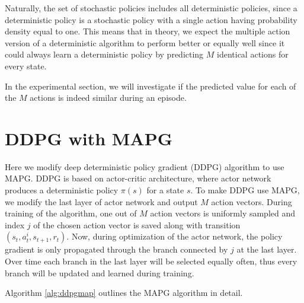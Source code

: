 Naturally, the set of stochastic policies includes all deterministic policies, since a deterministic policy is a stochastic policy with a single action having probability density equal to one. This means that in theory, we expect the multiple action version of a deterministic algorithm to perform better or equally well since it could always learn a deterministic policy by predicting $M$ identical actions for every state.

In the experimental section, we will investigate if the predicted value for each of the $M$ actions is indeed similar during an episode. 

\newpage
\section{DDPG with MAPG}
Here we modify deep deterministic policy gradient (DDPG) algorithm to use MAPG. DDPG is based on actor-critic architecture, where actor network produces a deterministic policy $\pi(s)$ for a state $s$. To make DDPG use MAPG, we modify the last layer of actor network and output $M$ action vectors. During training of the algorithm, one out of $M$ action vectors is uniformly sampled and index $j$ of the chosen action vector is saved along with transition $(s_t, a^i_t, s_{t+1}, r_t) $. Now, during optimization of the actor network, the policy gradient is only propagated through the branch connected by $j$ at the last layer. Over time each branch in the last layer will be selected equally often, thus every branch will be updated and learned during training. 


Algorithm \ref{alg:ddpgmap} outlines the MAPG algorithm in detail. 


\newpage

